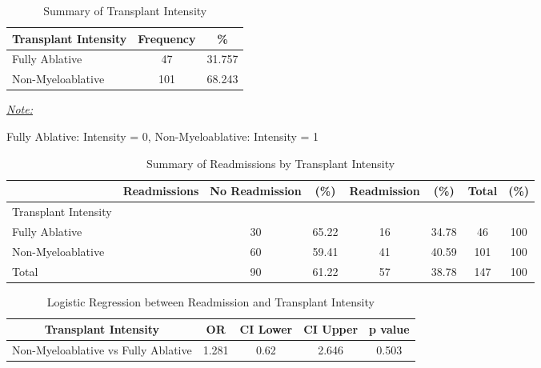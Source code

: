 \documentclass[12pt,]{article}
\begin{document}
\begin{table}[!h]

\caption{\label{tab:unnamed-chunk-44}Summary of Transplant Intensity}
\centering
\begin{threeparttable}
\begin{tabular}{>{\centering\arraybackslash}p{5cm}cc}
\toprule
Transplant Intensity & Frequency & \%\\
\midrule
Fully Ablative & 47 & 31.757\\
\rowcolor[HTML]{E3E5E7}  Non-Myeloablative & 101 & 68.243\\
\bottomrule
\end{tabular}
\begin{tablenotes}[para]
\item \underline{\textit{Note:}} 
\item Fully Ablative: Intensity = 0, Non-Myeloablative: Intensity = 1
\end{tablenotes}
\end{threeparttable}
\end{table}

\begin{table}[!h]

\caption{\label{tab:unnamed-chunk-44}Summary of Readmissions by Transplant Intensity}
\centering
\begin{tabular}{>{\centering\arraybackslash}p{5cm}ccccccc}
\toprule
  & Readmissions & No Readmission & (\%) & Readmission & (\%) & Total & (\%)\\
\midrule
Transplant Intensity &  &  &  &  &  &  & \\
\rowcolor[HTML]{E3E5E7}  Fully Ablative &  & 30 & 65.22 & 16 & 34.78 & 46 & 100\\
Non-Myeloablative &  & 60 & 59.41 & 41 & 40.59 & 101 & 100\\
\rowcolor[HTML]{E3E5E7}  Total &  & 90 & 61.22 & 57 & 38.78 & 147 & 100\\
\bottomrule
\end{tabular}
\end{table}

\begin{table}[!h]

\caption{\label{tab:unnamed-chunk-44}Logistic Regression between Readmission and Transplant Intensity}
\centering
\begin{tabular}{ccccc}
\toprule
Transplant Intensity & OR & CI Lower & CI Upper & p value\\
\midrule
\rowcolor{white}  Non-Myeloablative vs Fully Ablative & 1.281 & 0.62 & 2.646 & 0.503\\
\bottomrule
\end{tabular}
\end{table}
\end{document}

